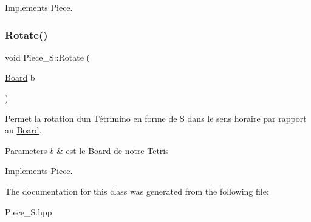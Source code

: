 Implements \hyperlink{classPiece_a56cdf7f4234fe848a3e203b693b7a862}{Piece}.

\mbox{\label{classPiece__S_aefb2837f39f6b05bc678a3fdadc192b0}} 
\subsubsection{\texorpdfstring{Rotate()}{Rotate()}}
{\footnotesize\ttfamily void Piece\+\_\+\+S\+::\+Rotate (\begin{DoxyParamCaption}\item[{\hyperlink{classBoard}{Board}}]{b }\end{DoxyParamCaption})\hspace{0.3cm}{\ttfamily [virtual]}}



Permet la rotation d\textquotesingle{}un Tétrimino en forme de S dans le sens horaire par rapport au \hyperlink{classBoard}{Board}. 


\begin{DoxyParams}{Parameters}
{\em b} & est le \hyperlink{classBoard}{Board} de notre Tetris \\
\hline
\end{DoxyParams}


Implements \hyperlink{classPiece_a078f3cc6281cb8f60af3ae2266c651ba}{Piece}.



The documentation for this class was generated from the following file\+:\begin{DoxyCompactItemize}
\item 
Piece\+\_\+\+S.\+hpp\end{DoxyCompactItemize}
